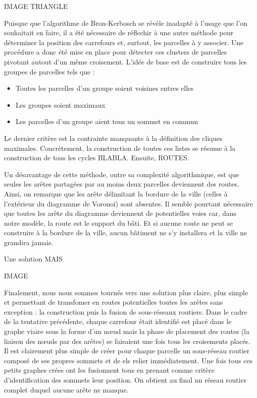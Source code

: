 \documentclass[10pt]{article}
\begin{document}
IMAGE TRIANGLE

Puisque que l'algorithme de Bron-Kerbosch se révèle inadapté à l'usage
que l'on souhaitait en faire, il a été nécessaire de réflechir à une
autre méthode pour déterminer la position des carrefours et, surtout,
les parcelles à y associer. Une procédure a donc été mise en place
pour détecter ces clusters de parcelles pivotant autout d'un même
croisement. L'idée de base est de construire tous les groupes de
parcelles tels que :

\begin{itemize}
\item{Toutes les parcelles d'un groupe soient voisines entres elles}
\item{Les groupes soient maximaux}
\item{Les parcelles d'un groupe aient tous un sommet en commun}
\end{itemize}

Le dernier critère est la contrainte manquante à la définition des
cliques maximales. Concrètement, la construction de toutes ces listes
se résume à la construction de tous les cycles BLABLA. Ensuite,
ROUTES.

Un désavantage de cette méthode, outre sa complexité algorithmique,
est que seules les arêtes partagées par au moins deux parcelles
deviennent des routes. Ainsi, on remarque que les arête délimitant la
bordure de la ville (celles à l'extérieur du diagramme de Voronoï)
sont absentes. Il semble pourtant nécessaire que toutes les arête du
diagramme deviennent de potentielles voies car, dans notre modèle, la
route est le support du bâti. Et si aucune route ne peut se construire
à la bordure de la ville, aucun bâtiment ne s'y installera et la ville
ne grandira jamais.

Une solution MAIS

IMAGE

Finalement, nous nous sommes tournés vers une solution plus claire,
plus simple et permettant de transfomer en routes potentielles toutes
les arêtes sans exception : la construction puis la fusion de
sous-réseaux routiers. Dans le cadre de la tentative précédente,
chaque carrefour était identifié est placé dans le graphe viaire sous
la forme d'un n\oe ud mais la phase de placement des routes (la
liaison des n\oe uds par des arêtes) se faisaient une fois tous les
croisements placés. Il est clairement plus simple de créer pour chaque
parcelle un sous-réseau routier composé de ses propres sommets et de
els relier immédiatement. Une fois tous ces petits graphes crées ont
les fusionnent tous en prenant comme critère d'identification des
sommets leur position. On obtient au final un réseau routier complet
duquel aucune arête ne manque.
\end{document}
